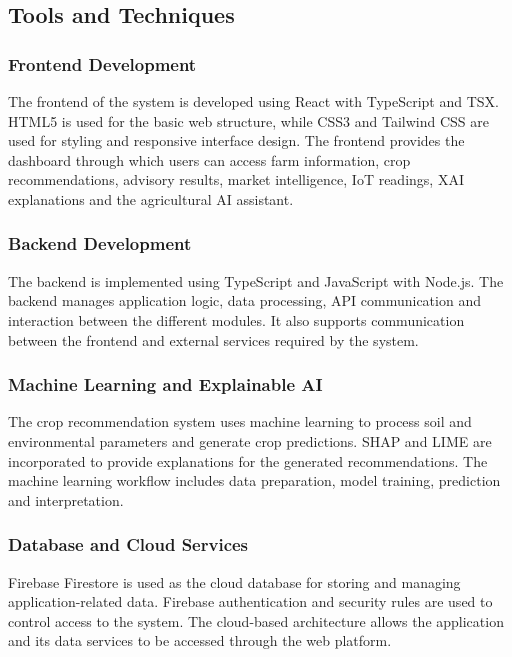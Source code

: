 \subsection{Tools and Techniques}

\subsubsection{Frontend Development}

The frontend of the system is developed using React with TypeScript and TSX. HTML5 is used for the basic web structure, while CSS3 and Tailwind CSS are used for styling and responsive interface design. The frontend provides the dashboard through which users can access farm information, crop recommendations, advisory results, market intelligence, IoT readings, XAI explanations and the agricultural AI assistant.

\subsubsection{Backend Development}

The backend is implemented using TypeScript and JavaScript with Node.js. The backend manages application logic, data processing, API communication and interaction between the different modules. It also supports communication between the frontend and external services required by the system.

\subsubsection{Machine Learning and Explainable AI}

The crop recommendation system uses machine learning to process soil and environmental parameters and generate crop predictions. SHAP and LIME are incorporated to provide explanations for the generated recommendations. The machine learning workflow includes data preparation, model training, prediction and interpretation.

\subsubsection{Database and Cloud Services}

Firebase Firestore is used as the cloud database for storing and managing application-related data. Firebase authentication and security rules are used to control access to the system. The cloud-based architecture allows the application and its data services to be accessed through the web platform.

